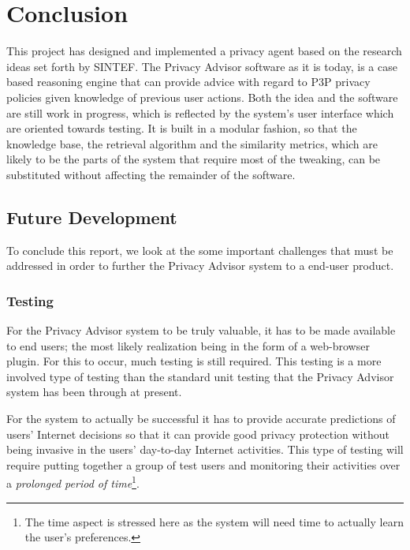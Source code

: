  

\chapter{Conclusion}\label{conclusion}

\minitoc

This project has designed and implemented a privacy agent based on the
research ideas set forth by SINTEF. The Privacy Advisor software as it
is today, is a case based reasoning engine that can provide advice
with regard to P3P privacy policies given knowledge of previous user
actions. Both the idea and the software are still work in progress,
which is reflected by the system's user interface which are oriented
towards testing. It is built in a modular fashion, so that the
knowledge base, the retrieval algorithm and the similarity metrics, which are likely to be the
parts of the system that require most of the tweaking, can
be substituted without affecting the remainder of the software.

\section{Future Development}

To conclude this report, we look at the some important challenges that
must be addressed in order to further the Privacy Advisor system to a
end-user product.

\subsection{Testing}
For the Privacy Advisor system to be truly valuable, it has to be made
available to end users; the most likely realization being in the
form of a web-browser plugin. For this to occur, much testing is still
required. This testing is a more involved type of testing than the standard
unit testing that the Privacy Advisor system has been through at present.

For the system to actually be successful it has to provide accurate predictions
of users' Internet decisions so that it can provide good privacy protection
without being invasive in the users' day-to-day Internet activities. This type
of testing will require putting together a group of test users and monitoring their
activities over a \emph{prolonged period of time}\footnote{The time aspect is stressed here
as the system will need time to actually learn the user's preferences.}. 

